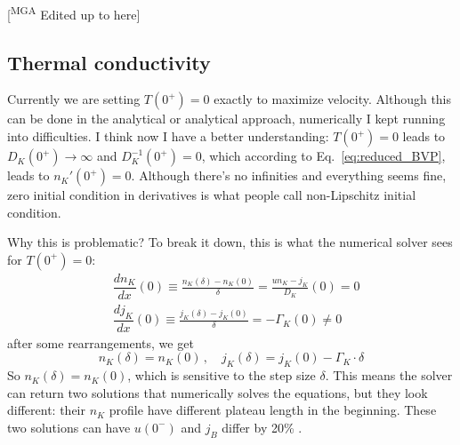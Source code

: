 \documentclass[10pt,superscriptaddress,
amsmath,aps,prc,twocolumn,nofootinbib,floatfix]{revtex4-1}
\newcommand{\mgacom}[1]{\textsf{\color[rgb]{0.8,0,0}[\textsuperscript{MGA} #1]}}
\newcommand{\JS}[1]{{\color{violet}#1}}
\begin{document}
\mgacom{Edited up to here}

\iffalse
\JS{

\subsection{Thermal conductivity}

Currently we are setting $T(0^+) = 0$ exactly to maximize velocity. Although this can be done in the analytical or analytical approach, numerically I kept running into difficulties. I think now I have a better understanding: $T(0^+) = 0$ leads to $D_K(0^+)\to \infty$ and $D_K^{-1}(0^+) = 0$, which according to Eq.~\eqref{eq:reduced_BVP}, leads to $n_K'(0^+) = 0$. Although there's no infinities and everything seems fine, zero initial condition in derivatives is what people call non-Lipschitz initial condition. 

Why this is problematic? To break it down, this is what the numerical solver sees for $T(0^+) = 0$:
\[
\begin{aligned}
& \dfrac{dn_K}{dx}(0) \equiv \frac{n_K(\delta) - n_K(0)}{\delta} = \frac{u n_K - j_K}{D_K}(0) = 0\\
& \dfrac{d j_K}{dx}(0)\equiv \frac{j_K(\delta) - j_K(0)}{\delta} = -\Gamma_K(0)\neq 0
\end{aligned}
\]
after some rearrangements, we get
\[
n_K(\delta) = n_K(0)\,,\quad j_K(\delta) = j_K(0) - \Gamma_K\cdot \delta
\]
So $n_K(\delta) = n_K(0)$, which is sensitive to the step size $\delta$. This means the solver can return two solutions that numerically solves the equations, but they look different: their $n_K$ profile have different plateau length in the beginning. These two solutions can have $u(0^-)$ and $j_B$ differ by 20\% . 

}
\end{document}
